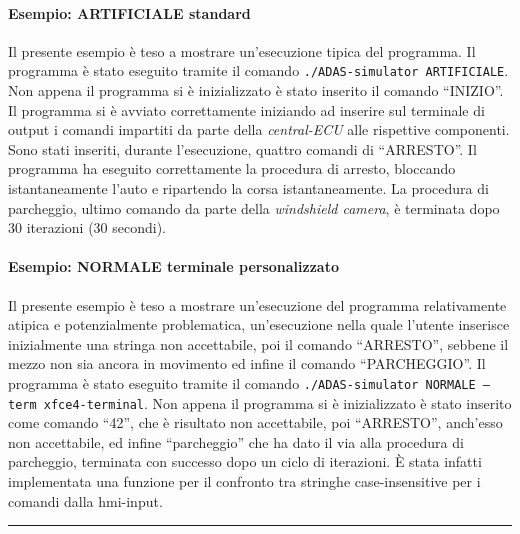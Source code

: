 \documentclass[11pt, openany]{article}
\theoremstyle{definition}
\theoremstyle{plain}
\theoremstyle{remark}
\begin{document}
	\paragraph{Esempio: ARTIFICIALE standard}
	Il presente esempio è teso a mostrare un'esecuzione tipica del programma.
	Il programma è stato eseguito tramite il comando \texttt{./ADAS-simulator ARTIFICIALE}. Non appena il programma si è inizializzato è stato inserito il comando ``INIZIO''. Il programma si è avviato correttamente iniziando ad inserire sul terminale di output i comandi impartiti da parte della \textit{central-ECU} alle rispettive componenti. Sono stati inseriti, durante l'esecuzione, quattro comandi di ``ARRESTO''. Il programma ha eseguito correttamente la procedura di arresto, bloccando istantaneamente l'auto e ripartendo la corsa istantaneamente. La procedura di parcheggio, ultimo comando da parte della \textit{windshield camera}, è terminata dopo 30 iterazioni (30 secondi).
	
	\paragraph{Esempio: NORMALE terminale personalizzato}
	Il presente esempio è teso a mostrare un'esecuzione del programma relativamente atipica e potenzialmente problematica, un'esecuzione nella quale l'utente inserisce inizialmente una stringa non accettabile, poi il comando ``ARRESTO'', sebbene il mezzo non sia ancora in movimento ed infine il comando ``PARCHEGGIO''.
	Il programma è stato eseguito tramite il comando \texttt{./ADAS-simulator NORMALE --term xfce4-terminal}. Non appena il programma si è inizializzato è stato inserito come comando ``42'', che è risultato non accettabile, poi ``ARRESTO'', anch'esso non accettabile, ed infine ``parcheggio'' che ha dato il via alla procedura di parcheggio, terminata con successo dopo un ciclo di iterazioni. È stata infatti implementata una funzione per il confronto tra stringhe case-insensitive per i comandi dalla hmi-input.
	
	\newpage
	\hrule
	\tableofcontents
	
\end{document}
